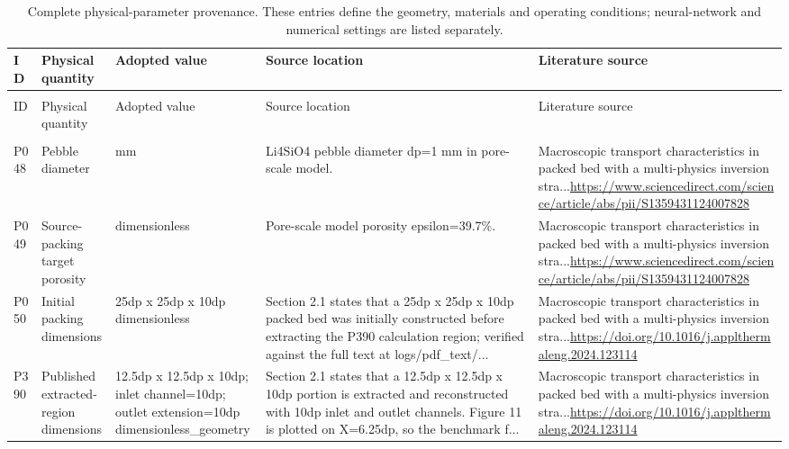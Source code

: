 \begingroup
\scriptsize
\setlength{\tabcolsep}{3pt}
\begin{longtable}{>{\raggedright\arraybackslash}p{1.05cm}>{\raggedright\arraybackslash}p{2.45cm}>{\raggedright\arraybackslash}p{2.65cm}>{\raggedright\arraybackslash}p{3.65cm}>{\raggedright\arraybackslash}p{5.25cm}}
\caption{Complete physical-parameter provenance. These entries define the geometry, materials and operating conditions; neural-network and numerical settings are listed separately.}\label{tab:supp_physical_parameters}\\
\toprule
ID & Physical quantity & Adopted value & Source location & Literature source \\
\midrule
\endfirsthead
\multicolumn{5}{l}{\textit{Table \thetable\ continued}}\\
\toprule
ID & Physical quantity & Adopted value & Source location & Literature source \\
\midrule
\endhead
\midrule
\multicolumn{5}{r}{\textit{Continued on next page}}\\
\endfoot
\bottomrule
\endlastfoot
P048 & Pebble diameter & 1 mm & Li4SiO4 pebble diameter dp=\allowbreak{}1 mm in pore-scale model. & Macroscopic transport characteristics in packed bed with a multi-physics inversion stra...\newline \url{https://www.sciencedirect.com/science/article/abs/pii/S1359431124007828} \\
P049 & Source-packing target porosity & 0.397 dimensionless & Pore-scale model porosity epsilon=\allowbreak{}39.7\%. & Macroscopic transport characteristics in packed bed with a multi-physics inversion stra...\newline \url{https://www.sciencedirect.com/science/article/abs/pii/S1359431124007828} \\
P050 & Initial packing dimensions & 25dp x 25dp x 10dp dimensionless & Section 2.1 states that a 25dp x 25dp x 10dp packed bed was initially constructed before extracting the P390 calculation region;\allowbreak{} verified against the full text at logs/\allowbreak{}pdf\_\allowbreak{}text/\allowbreak{}... & Macroscopic transport characteristics in packed bed with a multi-physics inversion stra...\newline \url{https://doi.org/10.1016/j.applthermaleng.2024.123114} \\
P390 & Published extracted-region dimensions & 12.5dp x 12.5dp x 10dp;\allowbreak{} inlet channel=\allowbreak{}10dp;\allowbreak{} outlet extension=\allowbreak{}10dp dimensionless\_\allowbreak{}geometry & Section 2.1 states that a 12.5dp x 12.5dp x 10dp portion is extracted and reconstructed with 10dp inlet and outlet channels. Figure 11 is plotted on X=\allowbreak{}6.25dp,\allowbreak{} so the benchmark f... & Macroscopic transport characteristics in packed bed with a multi-physics inversion stra...\newline \url{https://doi.org/10.1016/j.applthermaleng.2024.123114} \\

\end{longtable}
